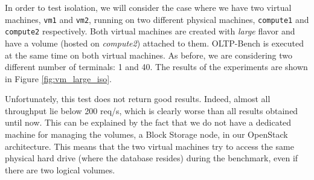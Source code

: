 In order to test isolation, we will consider the case where we have two virtual machines, \texttt{vm1} and \texttt{vm2}, running on two different physical machines, \texttt{compute1} and \texttt{compute2} respectively. 
Both virtual machines are created with \textit{large} flavor and have a volume (hosted on \textit{compute2}) attached to them. 
OLTP-Bench is executed at the same time on both virtual machines. 
As before, we are considering two different number of terminals: 1 and 40. 
The results of the experiments are shown in Figure \ref{fig:vm_large_iso}.

Unfortunately, this test does not return good results.
Indeed, almost all throughput lie below 200 req/s, which is clearly worse than all results obtained until now.
This can be explained by the fact that we do not have a dedicated machine for managing the volumes, a Block Storage node, in our OpenStack architecture.
This means that the two virtual machines try to access the same physical hard drive (where the database resides) during the benchmark, even if there are two logical volumes.


